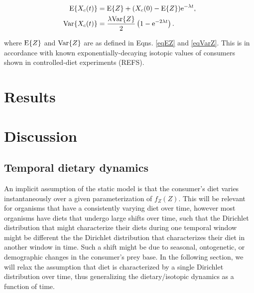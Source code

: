 \documentclass[11pt]{article}
\begin{document}
\begin{align}
{\rm E}\{X_c(t)\} &= {\rm E}\{Z\} + (X_c(0) - {\rm E}\{Z\}){\rm e}^{-\lambda t}, \nonumber \\
{\rm Var}\{X_c(t)\} &= \frac{\lambda {\rm Var}\{Z\}}{2}\left(1 - {\rm e}^{-2\lambda t}\right).
\end{align}

\noindent where ${\rm E}\{Z\}$ and ${\rm Var}\{Z\}$ are as defined in Eqns. \ref{eqEZ} and \ref{eqVarZ}.
This is in accordance with known exponentially-decaying isotopic values of consumers shown in controlled-diet experiments (REFS).





\section{Results}









\section{Discussion}





\subsection{Temporal dietary dynamics}
An implicit assumption of the static model is that the consumer's diet varies instantaneously over a given parameterization of $f_Z(Z)$.
This will be relevant for organisms that have a consistently varying diet over time, however most organisms have diets that undergo large shifts over time, such that the Dirichlet distribution that might characterize their diets during one temporal window might be different the the Dirichlet distribution that characterizes their diet in another window in time.
Such a shift might be due to seasonal, ontogenetic, or demographic changes in the consumer's prey base.
In the following section, we will relax the assumption that diet is characterized by a single Dirichlet distribution over time, thus generalizing the dietary/isotopic dynamics as a function of time.
\end{document}

